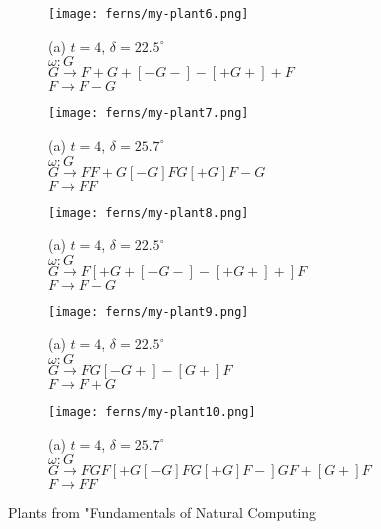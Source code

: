 \begin{figure}[tbh]
\begin{center}
\begin{subfigure}[tbh]{0.23\textwidth}
\begin{center}
	\end{center}
	\end{subfigure}
\hfill
	\begin{subfigure}[tbh]{0.23\textwidth}
	\begin{center}
	\texttt{[image: ferns/my-plant6.png]}
	\caption{(a) $t = 4$, $\delta = 22.5^{\circ}$ \\ $\omega: G $\\ $G \rightarrow F+G+[-G-]-[+G+]+F$\\ $F \rightarrow F-G$}
	\end{center}
	\end{subfigure}
\hfill
	\begin{subfigure}[tbh]{0.23\textwidth}
	\begin{center}
	\texttt{[image: ferns/my-plant7.png]}
	\caption{(a) $t = 4$, $\delta = 25.7^{\circ}$ \\ $\omega: G$ \\ $G \rightarrow FF+G[-G]FG[+G]F-G$\\ $F \rightarrow FF$}
	\end{center}
	\end{subfigure}
\hfill
	\begin{subfigure}[tbh]{0.23\textwidth}
	\begin{center}
	\texttt{[image: ferns/my-plant8.png]}
	\caption{(a) $t = 4$, $\delta = 22.5^{\circ}$ \\ $\omega: G$ \\ $G \rightarrow F[+G+[-G-]-[+G+]+]F$\\ $F \rightarrow F-G$}
	\end{center}
	\end{subfigure}
\hfill
	\begin{subfigure}[tbh]{0.23\textwidth}
	\begin{center}
	\texttt{[image: ferns/my-plant9.png]}
	\caption{(a) $t = 4$, $\delta = 22.5^{\circ}$ \\ $\omega: G$ \\ $G \rightarrow FG[-G+]-[G+]F$\\ $F \rightarrow F+G$}
	\end{center}
	\end{subfigure}
\hfill
	\begin{subfigure}[tbh]{0.23\textwidth}
	\begin{center}
	\texttt{[image: ferns/my-plant10.png]}
	\caption{(a) $t = 4$, $\delta = 25.7^{\circ}$ \\ $\omega: G$ \\ $G \rightarrow FGF[+G[-G]FG[+G]F-]GF+[G+]F$\\ $F \rightarrow FF$}
	\end{center}
	\end{subfigure}
\hfill
\end{center}
\caption{ Plants from "Fundamentals of Natural Computing}
\end{figure} \label{myPlants}

